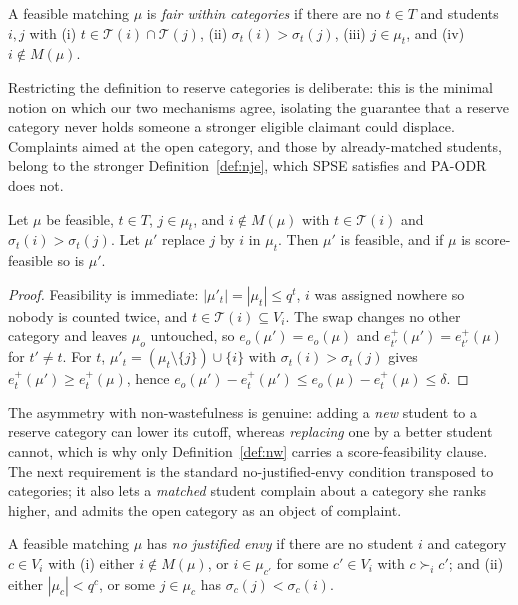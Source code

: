 \documentclass[runningheads]{llncs}
\newcommand{\T}{\mathcal{T}}
\begin{document}
\begin{definition}
\label{def:fair}
A feasible matching $\mu$ is \emph{fair within categories} if there are no $t\in T$ and students $i,j$ with (i) $t\in\T(i)\cap\T(j)$, (ii) $\sigma_t(i)>\sigma_t(j)$, (iii) $j\in\mu_t$, and (iv) $i\notin M(\mu)$.
\end{definition}

Restricting the definition to reserve categories is deliberate: this is the minimal notion on which our two mechanisms agree, isolating the guarantee that a reserve category never holds someone a stronger eligible claimant could displace. Complaints aimed at the open category, and those by already-matched students, belong to the stronger Definition~\ref{def:nje}, which SPSE satisfies and PA-ODR does not.

\begin{lemma}
\label{lem:fair-sf}
Let $\mu$ be feasible, $t\in T$, $j\in\mu_t$, and $i\notin M(\mu)$ with $t\in\T(i)$ and $\sigma_t(i)>\sigma_t(j)$. Let $\mu'$ replace $j$ by $i$ in $\mu_t$. Then $\mu'$ is feasible, and if $\mu$ is score-feasible so is $\mu'$.
\end{lemma}

\begin{proof}
Feasibility is immediate: $|\mu'_t|=|\mu_t|\le q^t$, $i$ was assigned nowhere so nobody is counted twice, and $t\in\T(i)\subseteq V_i$. The swap changes no other category and leaves $\mu_o$ untouched, so $e_o(\mu')=e_o(\mu)$ and $e_{t'}^+(\mu')=e_{t'}^+(\mu)$ for $t'\neq t$. For $t$, $\mu'_t=(\mu_t\setminus\{j\})\cup\{i\}$ with $\sigma_t(i)>\sigma_t(j)$ gives $e_t^+(\mu')\ge e_t^+(\mu)$, hence $e_o(\mu')-e_t^+(\mu')\le e_o(\mu)-e_t^+(\mu)\le\delta$.
\end{proof}

The asymmetry with non-wastefulness is genuine: adding a \emph{new} student to a reserve category can lower its cutoff, whereas \emph{replacing} one by a better student cannot, which is why only Definition~\ref{def:nw} carries a score-feasibility clause. The next requirement is the standard no-justified-envy condition transposed to categories; it also lets a \emph{matched} student complain about a category she ranks higher, and admits the open category as an object of complaint.

\begin{definition}
\label{def:nje}
A feasible matching $\mu$ has \emph{no justified envy} if there are no student $i$ and category $c\in V_i$ with (i) either $i\notin M(\mu)$, or $i\in\mu_{c'}$ for some $c'\in V_i$ with $c\succ_i c'$; and (ii) either $|\mu_c|<q^c$, or some $j\in\mu_c$ has $\sigma_c(j)<\sigma_c(i)$.
\end{definition}
\end{document}
